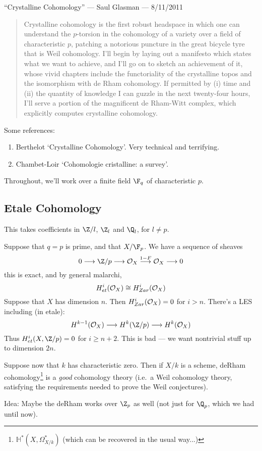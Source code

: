 \begin{SaulCrystallineCohomology}
\KanSemResponse
{``Crystalline Cohomology'' --- Saul Glasman --- 8/11/2011}
\begin{abstract}
Crystalline cohomology is the first robust headspace in which one can understand the $p$-torsion in the cohomology of a variety over a field of characteristic $p$, patching a notorious puncture in the great bicycle tyre that is Weil cohomology. I'll begin by laying out a manifesto which states what we want to achieve, and I'll go on to sketch an achievement of it, whose vivid chapters include the functoriality of the crystalline topos and the isomorphism with de Rham cohomology. If permitted by (i) time and (ii) the quantity of knowledge I can guzzle in the next twenty-four hours, I'll serve a portion of the magnificent de Rham-Witt complex, which explicitly computes crystalline cohomology.
\end{abstract}
Some references:
\begin{enumerate}\squishlist
\item Berthelot `Crystalline Cohomology'. Very technical and terrifying.
\item Chambet-Loir `Cohomologie cristalline: a survey'.
\end{enumerate}
Throughout, we'll work over a finite field $\F_q$ of characteristic $p$.
\subsection*{Etale Cohomology}
This takes coefficients in $\Z/l$, $\Z_l$ and $\Q_l$, for $l\neq p$.

Suppose that $q=p$ is prime, and that $X/\F_p$. We have a sequence of sheaves
\[0\to\Z/p\to\calO_X\overset{1-F}{\to}\calO_X\to0\]
this is exact, and by general malarchi,
\[H^i_{et}(\mathcal{O}_X)\cong H^i_{Zar}(\mathcal{O}_X)\]
Suppose that $X$ has dimension $n$. Then $H^i_{Zar}(\mathcal{O}_X)=0$ for $i>n$. There's a LES including (in etale):
\[H^{k-1}(\calO_X)\to H^k(\Z/p)\to H^k(\calO_X)\]
Thus $H^i_{et}(X,\Z/p)=0$ for $i\geq n+2$. This is bad --- we want nontrivial stuff up to dimension $2n$.

Suppose now that $k$ has characteristic zero. Then if $X/k$ is a scheme, deRham cohomology\footnote{$\mathbb{H}^*(X,\Omega^*_{X/k})$ (which can be recovered in the usual way...)} is a \emph{good} cohomology theory (i.e.\ a Weil cohomology theory, satisfying the requirements needed to prove the Weil conjectures).

Idea: Maybe the deRham works over $\Z_p$ as well (not just for $\Q_p$, which we had until now).


\end{SaulCrystallineCohomology}
